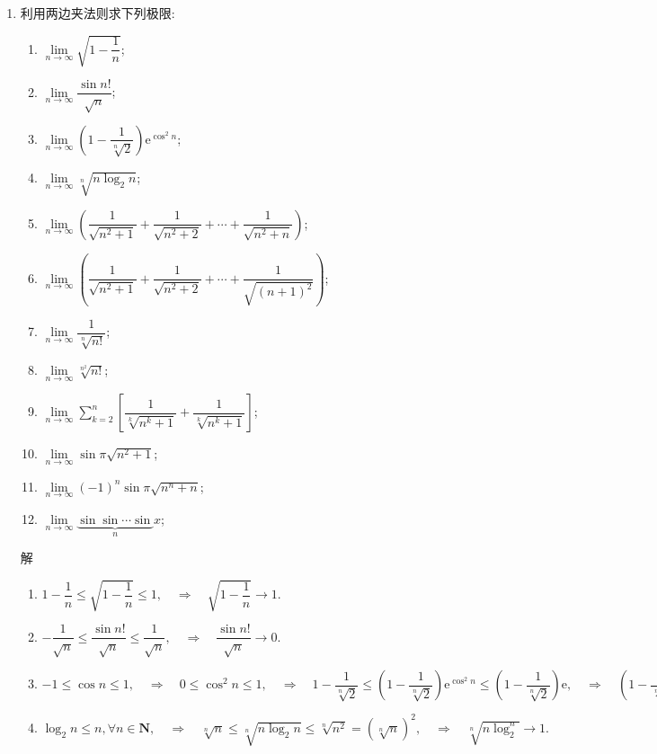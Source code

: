 \documentclass[UTF8,a4paper,20pt]{article}
\begin{document}
\begin{enumerate}
\begin{enumerate}[(1)]
	\end{enumerate}

\item {\large\kaishu 利用两边夹法则求下列极限:}
	\begin{enumerate}[(1)]
	\item $\lim\limits_{n\to\infty}\sqrt{1-\dfrac{1}{n}}$;
	\item $\lim\limits_{n\to\infty}\dfrac{\sin n!}{\sqrt{n}}$;
	\item $\lim\limits_{n\to\infty}\left(1-\dfrac{1}{\sqrt[n]{2}}\right){\mathrm e}^{\cos^2n}$;
	\item $\lim\limits_{n\to\infty}\sqrt[n]{n\log_2n}$;
	\item $\lim\limits_{n\to\infty}\left(\dfrac{1}{\sqrt{n^2+1}}+\dfrac{1}{\sqrt{n^2+2}}+\cdots+\dfrac{1}{\sqrt{n^2+n}}\right)$;
	\item $\lim\limits_{n\to\infty}\left(\dfrac{1}{\sqrt{n^2+1}}+\dfrac{1}{\sqrt{n^2+2}}+\cdots+\dfrac{1}{\sqrt{(n+1)^2}}\right)$;
	\item $\lim\limits_{n\to\infty}\dfrac{1}{\sqrt[n]{n!}}$;
	\item $\lim\limits_{n\to\infty}\sqrt[n^2]{n!}$;
	\item $\lim\limits_{n\to\infty}\sum\limits_{k=2}^n\left[\dfrac{1}{\sqrt[k]{n^k+1}}+\dfrac{1}{\sqrt[k]{n^k+1}}\right]$;
	\item $\lim\limits_{n\to\infty}\sin{\pi\sqrt{n^2+1}}$;
	\item $\lim\limits_{n\to\infty}(-1)^n\sin{\pi\sqrt{n^n+n}}$;
	\item $\lim\limits_{n\to\infty}\underbrace{\sin\sin\cdots\sin}_{n} x$;
	\end{enumerate}
{\heiti 解} 
	\begin{enumerate}[(1)]
	\item $1-\dfrac{1}{n}\leqslant\sqrt{1-\dfrac{1}{n}}\leqslant 1, \quad\Rightarrow\quad\sqrt{1-\dfrac{1}{n}}\to 1.$
	\item $-\dfrac{1}{\sqrt{n}}\leqslant\dfrac{\sin{n!}}{\sqrt{n}}\leqslant\dfrac{1}{\sqrt{n}}, \quad\Rightarrow\quad\dfrac{\sin{n!}}{\sqrt{n}}\to 0.$
	\item $-1\leqslant\cos{n}\leqslant{1}, \quad\Rightarrow\quad 0\leqslant\cos^2{n}\leqslant 1, \quad\Rightarrow\quad 1-\dfrac{1}{\sqrt[n]{2}}\leqslant\left(1-\dfrac{1}{\sqrt[n]{2}}\right){\mathrm e}^{\cos^2{n}}\leqslant\left(1-\dfrac{1}{\sqrt[n]{2}}\right){\mathrm e}, \quad\Rightarrow\quad\left(1-\dfrac{1}{\sqrt[n]{2}}\right){\mathrm e}^{\cos^2{n}}\to 0.$
	\item $\log_2{n}\leqslant n, \forall n \in \mathbf{N}, \quad\Rightarrow\quad \sqrt[n]{n}\leqslant\sqrt[n]{n\log_2{n}}\leqslant\sqrt[n]{n^2}=\left(\sqrt[n]{n}\right)^2, \quad\Rightarrow\quad \sqrt[n]{n\log_2^n}\to 1.$

\end{enumerate}
\end{enumerate}
\end{document}
